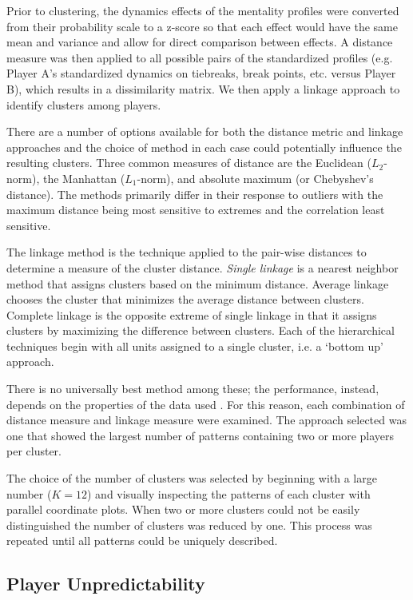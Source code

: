 \documentclass{Latex/svjour3}
\begin{document}
Prior to clustering, the dynamics effects of the mentality profiles were
converted from their probability scale to a z-score so that each effect would
have the same mean and variance and allow for direct comparison between
effects. A distance measure was then applied to all possible pairs of the
standardized profiles (e.g. Player A's standardized dynamics on tiebreaks, break
points, etc. versus Player B), which results in a dissimilarity matrix. We then
apply a linkage approach to identify clusters among players.

There are a number of options available for both the distance metric and linkage
approaches and the choice of method in each case could potentially influence the
resulting clusters. Three common measures of distance are the Euclidean
($L_2$-norm), the Manhattan ($L_1$-norm), and absolute maximum (or Chebyshev's
distance). The methods primarily differ in their response to outliers with the
maximum distance being most sensitive to extremes and the correlation least
sensitive.

The linkage method is the technique applied to the pair-wise distances to
determine a measure of the cluster distance. \textit{Single linkage} is a
nearest neighbor method that assigns clusters based on the minimum
distance. Average linkage chooses the cluster that minimizes the average
distance between clusters. Complete linkage is the opposite extreme of single
linkage in that it assigns clusters by maximizing the difference between
clusters. Each of the hierarchical techniques begin with all units assigned to a
single cluster, i.e. a `bottom up' approach.

There is no universally best method among these; the performance, instead,
depends on the properties of the data used \cite{kumar2014performance}. For this
reason, each combination of distance measure and linkage measure were
examined. The approach selected was one that showed the largest number of
patterns containing two or more players per cluster.

The choice of the number of clusters was selected by beginning with a large
number ($K = 12$) and visually inspecting the patterns of each cluster with
parallel coordinate plots. When two or more clusters could not be easily
distinguished the number of clusters was reduced by one. This process was
repeated until all patterns could be uniquely described.


\subsection{Player Unpredictability}
\end{document}
